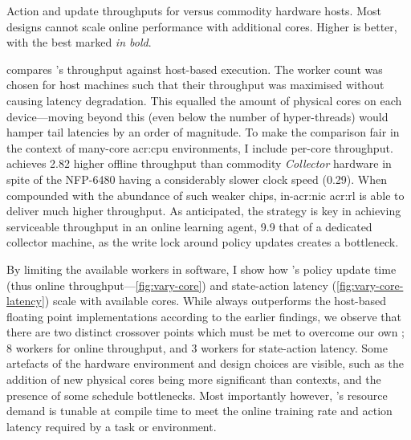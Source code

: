 \begin{table}
	\caption[Action and update throughputs for \approachshort{} versus commodity hardware hosts.]{Action and update throughputs for \approachshort{} versus commodity hardware hosts. Most designs cannot scale online performance with additional cores. Higher is better, with the best marked \emph{in bold}.\label{tab:tputs}}
\end{table}

 compares \approachshort{}'s throughput against host-based execution.
The worker count was chosen for host machines such that their throughput was maximised without causing latency degradation.
This equalled the amount of physical cores on each device---moving beyond this (even below the number of hyper-threads) would hamper tail latencies by an order of magnitude.
To make the comparison fair in the context of many-core \gls{acr:cpu} environments, I include per-core throughput.
\Indfw{} achieves \qty{2.82}{\times} higher offline throughput than commodity \emph{Collector} hardware in spite of the NFP-6480 having a considerably slower clock speed (\qty{0.29}{\times}).
When compounded with the abundance of such weaker chips, in-\gls{acr:nic} \gls{acr:rl} is able to deliver much higher throughput.
As anticipated, the \Coopfw{} strategy is key in achieving serviceable throughput in an online learning agent, \qty{9.9}{\times} that of a dedicated collector machine, as the write lock around policy updates creates a bottleneck.

By limiting the available workers in software, I show how \Coopfw{}'s policy update time (thus  online throughput---\cref{fig:vary-core}) and state-action latency (\cref{fig:vary-core-latency}) scale with available cores.
While \Coopfw{} always outperforms the host-based floating point implementations according to the earlier findings, we observe that there are two distinct crossover points which must be met to overcome our own \Indfw{}; \num{8} workers for online throughput, and \num{3} workers for state-action latency.
Some artefacts of the hardware environment and design choices are visible, such as the addition of new physical cores being more significant than contexts, and the presence of some schedule bottlenecks.
Most importantly however, \Coopfw{}'s resource demand is tunable at compile time to meet the online training rate and action latency required by a task or environment.


